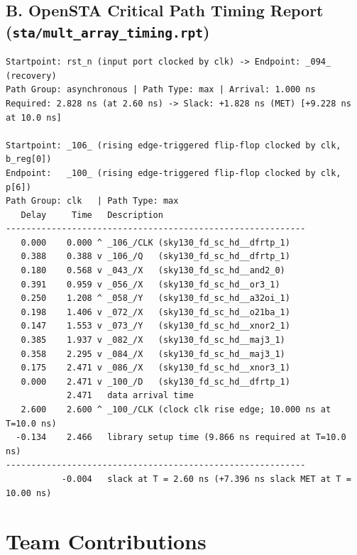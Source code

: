 \documentclass[conference,10pt]{IEEEtran}
\begin{document}
\subsection*{B. OpenSTA Critical Path Timing Report (\texttt{sta/mult\_array\_timing.rpt})}
\begin{lstlisting}[title={\textbf{OpenSTA Critical Path Report ($T_{\text{clk}} = 2.60\text{ ns}$ and $10.00\text{ ns}$)}},basicstyle=\ttfamily\tiny]
Startpoint: rst_n (input port clocked by clk) -> Endpoint: _094_ (recovery)
Path Group: asynchronous | Path Type: max | Arrival: 1.000 ns
Required: 2.828 ns (at 2.60 ns) -> Slack: +1.828 ns (MET) [+9.228 ns at 10.0 ns]

Startpoint: _106_ (rising edge-triggered flip-flop clocked by clk, b_reg[0])
Endpoint:   _100_ (rising edge-triggered flip-flop clocked by clk, p[6])
Path Group: clk   | Path Type: max
   Delay     Time   Description
-----------------------------------------------------------
   0.000    0.000 ^ _106_/CLK (sky130_fd_sc_hd__dfrtp_1)
   0.388    0.388 v _106_/Q   (sky130_fd_sc_hd__dfrtp_1)
   0.180    0.568 v _043_/X   (sky130_fd_sc_hd__and2_0)
   0.391    0.959 v _056_/X   (sky130_fd_sc_hd__or3_1)
   0.250    1.208 ^ _058_/Y   (sky130_fd_sc_hd__a32oi_1)
   0.198    1.406 v _072_/X   (sky130_fd_sc_hd__o21ba_1)
   0.147    1.553 v _073_/Y   (sky130_fd_sc_hd__xnor2_1)
   0.385    1.937 v _082_/X   (sky130_fd_sc_hd__maj3_1)
   0.358    2.295 v _084_/X   (sky130_fd_sc_hd__maj3_1)
   0.175    2.471 v _086_/X   (sky130_fd_sc_hd__xnor3_1)
   0.000    2.471 v _100_/D   (sky130_fd_sc_hd__dfrtp_1)
            2.471   data arrival time
   2.600    2.600 ^ _100_/CLK (clock clk rise edge; 10.000 ns at T=10.0 ns)
  -0.134    2.466   library setup time (9.866 ns required at T=10.0 ns)
-----------------------------------------------------------
           -0.004   slack at T = 2.60 ns (+7.396 ns slack MET at T = 10.00 ns)
\end{lstlisting}

\section{Team Contributions}
\end{document}

